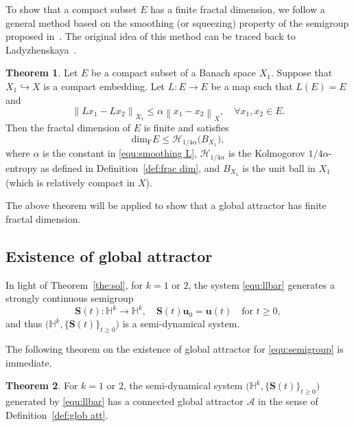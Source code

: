 \documentclass[11pt, reqno]{amsart}
\theoremstyle{definition}
\newtheorem{theorem}{Theorem}[section]
\numberwithin{equation}{section}
\newcommand{\bff}{\boldsymbol}
\newcommand{\bb}{\mathbb}
\newcommand{\norm}[2]{\left\|{#1}\right\|_{#2}}
\begin{document}
To show that a compact subset $E$ has a finite fractal dimension, we follow a general method based on the smoothing (or squeezing) property of the semigroup proposed in~\cite{EfeMir03, EfeMirZel00, Zel00, Zel23}. The original idea of this method can be traced back to Ladyzhenskaya~\cite{Lad86}.

\begin{theorem}\label{the:dim smooth}
Let $E$ be a compact subset of a Banach space $X_1$. Suppose that $X_1\hookrightarrow X$ is a compact embedding. Let $L:E\to E$ be a map such that $L(E)=E$ and
\begin{equation}\label{equ:smoothing L}
    \norm{Lx_1-Lx_2}{X_1} \leq \alpha \norm{x_1-x_2}{X}, \quad \forall x_1,x_2\in E.
\end{equation}
Then the fractal dimension of $E$ is finite and satisfies
\[
    \text{dim}_{\mathrm{F}} E\leq \mathcal{H}_{1/4\alpha} \big(B_{X_1}\big),
\]
where $\alpha$ is the constant in \eqref{equ:smoothing L}, $\mathcal{H}_{1/4\alpha}$ is the Kolmogorov $1/4\alpha$-entropy as defined in Definition~\ref{def:frac dim}, and $B_{X_1}$ is the unit ball in $X_1$ (which is relatively compact in $X$).
\end{theorem}

The above theorem will be applied to show that a global attractor has finite fractal dimension.



\subsection{Existence of global attractor}

In light of Theorem~\ref{the:sol}, for $k=1$ or $2$, the system \eqref{equ:llbar} generates a strongly continuous semigroup
\begin{equation}\label{equ:semigroup}
	\bff{S}(t): \bb{H}^k \to \bb{H}^k, \quad \bff{S}(t)\bff{u}_0= \bff{u}(t)  \quad \text{for } t\geq 0,
\end{equation}
and thus $\big(\bb{H}^k, \{\bff{S}(t)\}_{t\geq 0}\big)$ is a semi-dynamical system. 

The following theorem on the existence of global attractor for \eqref{equ:semigroup} is immediate.

\begin{theorem}\label{the:attractor}
For $k=1$ or $2$, the semi-dynamical system $\big(\bb{H}^k, \{\bff{S}(t)\}_{t\geq 0}\big)$ generated by \eqref{equ:llbar} has a connected global attractor $\mathcal{A}$ in the sense of Definition~\ref{def:glob att}.
\end{theorem}
\end{document}

